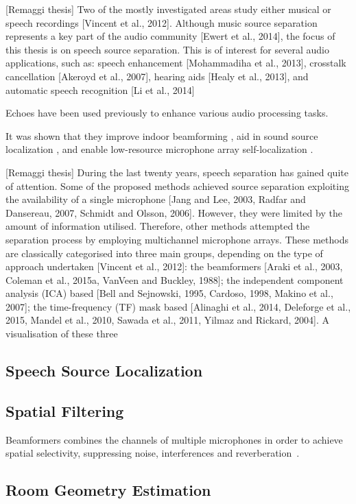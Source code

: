 [Remaggi thesis]
Two of the mostly investigated areas study either musical or speech recordings [Vincent et al., 2012].
Although music source separation represents a key part of the audio community [Ewert et al., 2014], the focus of this thesis is on speech source separation.
This is of interest for several audio applications, such as: speech enhancement [Mohammadiha et al., 2013], crosstalk cancellation [Akeroyd et al., 2007], hearing aids [Healy et al., 2013], and automatic speech recognition [Li et al., 2014]

Echoes have been used previously to enhance various audio processing tasks.

It was shown that they improve indoor beamforming ,
aid in sound source localization ,
and enable low-resource microphone array self-localization .

[Remaggi thesis]
During the last twenty years, speech separation has gained quite of attention. Some of the proposed methods achieved source separation exploiting the availability of a single microphone [Jang and Lee, 2003, Radfar and Dansereau, 2007, Schmidt and Olsson, 2006]. However, they were limited by the amount of information utilised. Therefore, other methods attempted the separation process by employing multichannel microphone arrays. These methods are classically categorised into three main groups, depending on the type of approach undertaken [Vincent et al., 2012]: the beamformers [Araki et al., 2003, Coleman et al., 2015a, VanVeen and Buckley, 1988]; the independent component analysis (ICA) based [Bell and Sejnowski, 1995, Cardoso, 1998, Makino et al., 2007]; the time-frequency (TF) mask based [Alinaghi et al., 2014, Deleforge et al., 2015, Mandel et al., 2010, Sawada et al., 2011, Yilmaz and Rickard, 2004]. A visualisation of these three

\subsection{Speech Source Localization}
\subsection{Spatial Filtering}
Beamformers combines the channels of multiple microphones in order to achieve spatial selectivity, suppressing noise, interferences and reverberation~.

\subsection{Room Geometry Estimation}